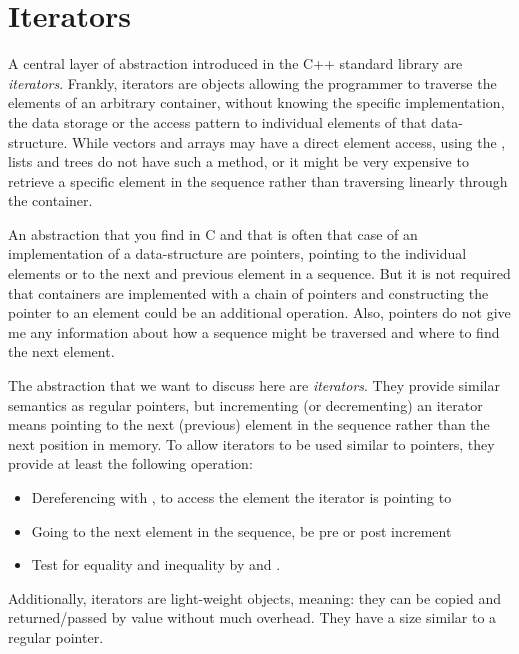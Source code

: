 \chapter{Iterators}
A central layer of abstraction introduced in the C++ standard library are \emph{iterators}. Frankly, iterators are objects allowing the
programmer to traverse the elements of an arbitrary container, without knowing the specific implementation, the data storage or the access pattern to
individual elements of that data-structure. While vectors and arrays may have a direct element access, using the , lists and trees do
not have such a method, or it might be very expensive to retrieve a specific element in the sequence rather than traversing linearly through the container.

An abstraction that you find in C and that is often that case of an implementation of a data-structure are pointers, pointing to the individual elements or
to the next and previous element in a sequence. But it is not required that containers are implemented with a chain of pointers and constructing the pointer
to an element could be an additional operation. Also, pointers do not give me any information about how a sequence might be traversed and where to find the
next element.

The abstraction that we want to discuss here are \emph{iterators}. They provide similar semantics as regular pointers, but incrementing (or decrementing)
an iterator means pointing to the next (previous) element in the sequence rather than the next position in memory. To allow iterators to be used similar to
pointers, they provide at least the following operation:

\begin{itemize}
  \item Dereferencing with , to access the element the iterator is pointing to
  \item Going to the next element in the sequence, be pre or post increment 
  \item Test for equality and inequality by  and .
\end{itemize}

Additionally, iterators are light-weight objects, meaning: they can be copied and returned/passed by value without much overhead. They have a size similar
to a regular pointer.

